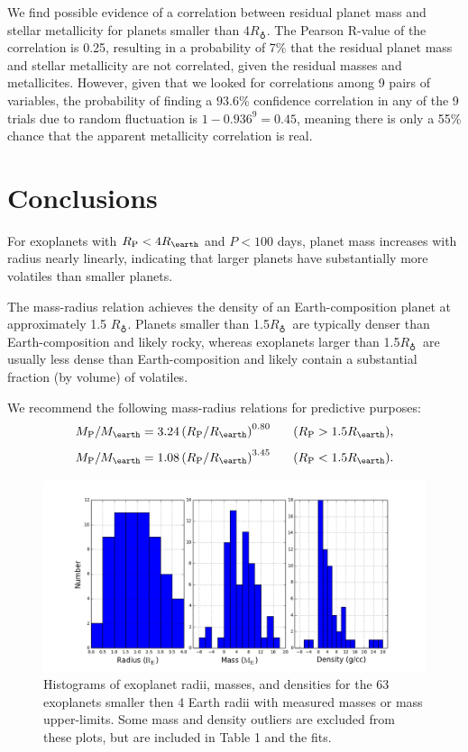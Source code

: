 \documentclass[iop]{emulateapj}
\newcommand{\rpl}{\ensuremath{R_{\rm P}}}
\newcommand{\mpl}{\ensuremath{M_{\rm P}}}
\newcommand{\rearth}{\ensuremath{R_\earth}}
\newcommand{\mearth}{\ensuremath{M_\earth}}
\newcommand{\rspecial}{4 \rearth}
\begin{document}
We find possible evidence of a correlation between residual planet mass and stellar metallicity for planets smaller than 4\rearth.  The Pearson R-value of the correlation is 0.25, resulting in a probability of 7\% that the residual planet mass and stellar metallicity are not correlated, given the residual masses and metallicites.  However, given that we looked for correlations among 9 pairs of variables, the probability of finding a $93.6\%$ confidence correlation in any of the 9 trials due to random fluctuation is $1 - 0.936^9 = 0.45$, meaning there is only a 55\% chance that the apparent metallicity correlation is real.


\section{Conclusions}
For exoplanets with $\rpl < \rspecial$ and $P < 100$ days, planet mass increases with radius nearly linearly, indicating that larger planets have substantially more volatiles than smaller planets.

The mass-radius relation achieves the density of an Earth-composition planet at approximately 1.5 \rearth.   Planets smaller than 1.5\rearth\ are typically denser than Earth-composition and likely rocky, whereas exoplanets larger than 1.5\rearth\ are usually less dense than Earth-composition and likely contain a substantial fraction (by volume) of volatiles.

We recommend the following mass-radius relations for predictive purposes:  $$\mpl/\mearth = 3.24 \left(\rpl/\rearth \right)^{0.80} ~~~~~(\rpl > 1.5\rearth),$$ $$\mpl/\mearth = 1.08 \left(\rpl/\rearth\right)^{3.45} ~~~~~(\rpl < 1.5\rearth).$$



\begin{figure}[htbp] %
   \centering
   \includegraphics[width=6in]{histograms.png} 
   \caption{\small Histograms of exoplanet radii, masses, and densities for the 63 exoplanets smaller then 4 Earth radii with measured masses or mass upper-limits.  Some mass and density outliers are excluded from these plots, but are included in Table 1 and the fits.}
\label{fig:histograms}
\end{figure}
\end{document}
